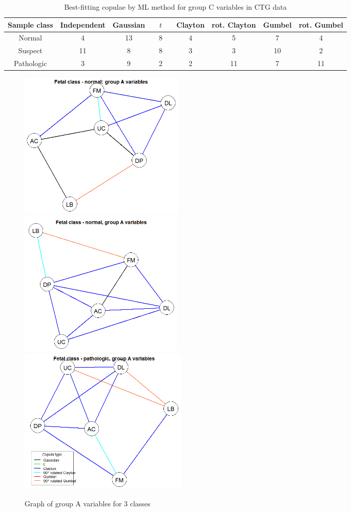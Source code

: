 \documentclass[11pt]{llncs}
\begin{document}
\begin{table}[h]\centering
    \begin{tabular}{|c||c|c|c|c|c|c|c|}
    \hline
    Sample class & Independent & Gaussian & $\quad t\quad$ & Clayton & rot. Clayton & Gumbel & rot. Gumbel \\ \hline
    Normal & 4 & 13 & 8 & 4 & 5 & 7 & 4 \\
    Suspect & 11 & 8 & 8 & 3 & 3 & 10 & 2 \\
    Pathologic & 3 & 9 & 2 & 2 & 11 & 7 & 11 \\ \hline
    \end{tabular}
    \caption{Best-fitting copulae by ML method for group C variables in CTG data}
\end{table}

\begin{figure}[H]
	\centering
		\includegraphics[height=7cm]{ctgplot_1a.png}\\
		\includegraphics[height=7cm]{ctgplot_2a.png}\\
		\includegraphics[height=7cm]{ctgplot_3a.png}
	\label{fig:fig2}
	\caption{Graph of group A variables for 3 classes}
\end{figure}
\end{document}
